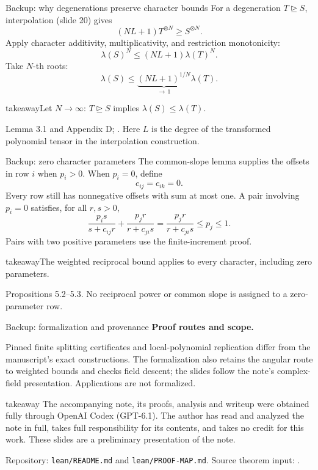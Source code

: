 \documentclass[aspectratio=169,11pt]{beamer}
\newcommand{\degen}{\unrhd}
\newcommand{\source}[1]{\vfill\par{\fontsize{7.5}{9}\selectfont\color{muted}#1\par}}
\newcommand{\takeaway}[1]{\begin{beamercolorbox}[sep=0.65em,wd=\linewidth]{takeaway}#1\end{beamercolorbox}}
\begin{document}
\begin{frame}{Backup: why degenerations preserve character bounds}
  For a degeneration $T\degen S$, interpolation (slide 20) gives
  \[
    (NL+1)T^{\otimes N}\ge S^{\otimes N}.
  \]
  Apply character additivity, multiplicativity, and restriction monotonicity:
  \[
    \lambda(S)^N\le(NL+1)\lambda(T)^N.
  \]
  Take $N$-th roots:
  \[
    \lambda(S)\le\underbrace{(NL+1)^{1/N}}_{\longrightarrow\,1}\lambda(T).
  \]
  \takeaway{Let $N\to\infty$: $T\degen S$ implies $\lambda(S)\le\lambda(T)$.}
  \source{Lemma 3.1 and Appendix D; \cite[Theorem 8]{interpolation}.
  Here $L$ is the degree of the transformed polynomial tensor in the
  interpolation construction.}
\end{frame}

\begin{frame}{Backup: zero character parameters}
  The common-slope lemma supplies the offsets in row $i$ when $p_i>0$.
  When $p_i=0$, define
  \[
    c_{ij}=c_{ik}=0.
  \]
  Every row still has nonnegative offsets with sum at most one.
  A pair involving $p_i=0$ satisfies, for all $r,s>0$,
  \[
    \frac{p_is}{s+c_{ij}r}+\frac{p_jr}{r+c_{ji}s}
    =\frac{p_jr}{r+c_{ji}s}\le p_j\le1.
  \]
  Pairs with two positive parameters use the finite-increment proof.
  \takeaway{The weighted reciprocal bound applies to every character,
  including zero parameters.}
  \source{Propositions 5.2--5.3. No reciprocal power or common slope
  is assigned to a zero-parameter row.}
\end{frame}

\begin{frame}{Backup: formalization and provenance}
  \textbf{Proof routes and scope.}\par\medskip
  Pinned finite splitting certificates and local-polynomial replication
  differ from the manuscript's exact constructions. The formalization also
  retains the angular route to weighted bounds and checks field descent;
  the slides follow the note's complex-field presentation.
  Applications are not formalized.
  \medskip
  \begin{beamercolorbox}[sep=0.7em,wd=\linewidth]{takeaway}
  \footnotesize
  The accompanying note, its proofs, analysis and writeup were obtained fully
  through OpenAI Codex (GPT-6.1). The author has read and analyzed the note in
  full, takes full responsibility for its contents, and takes no credit for
  this work. These slides are a preliminary presentation of the note.
  \end{beamercolorbox}
  \source{Repository: \texttt{lean/README.md} and \texttt{lean/PROOF-MAP.md}.
  Source theorem input: \cite{strassen,spectra}.}
\end{frame}
\end{document}
